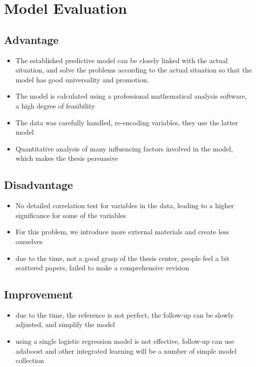\documentclass{mcmthesis}
\begin{document}
\section{Model Evaluation}
\subsection{Advantage}
\begin{itemize}
\item The established predictive model can be closely linked with the actual situation, and solve the problems according to the actual situation so that the model has good universality and promotion.
\item The model is calculated using a professional mathematical analysis software, a high degree of feasibility
\item The data was carefully handled, re-encoding variables, they use the latter model
\item Quantitative analysis of many influencing factors involved in the model, which makes the thesis persuasive
\end{itemize}
\subsection{Disadvantage}
\begin{itemize}
\item No detailed correlation test for variables in the data, leading to a higher significance for some of the variables
\item For this problem, we introduce more external materials and create less ourselves
\item due to the time, not a good grasp of the thesis center, people feel a bit scattered papers, failed to make a comprehensive revision
\end{itemize}
\subsection{Improvement}
\begin{itemize}
\item due to the time, the reference is not perfect, the follow-up can be slowly adjusted, and simplify the model
\item using a single logistic regression model is not effective, follow-up can use adaboost and other integrated learning will be a number of simple model collection
\end{itemize}
\end{document}
